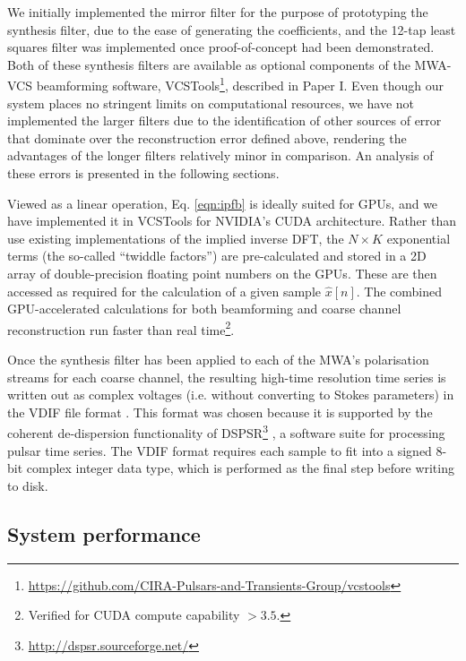 \documentclass{pasa}%
\newcommand{\PaperI}{Paper I\nocite{Ord2019}}
\newcommand{\vcstools}{VCSTools}
\begin{document}
We initially implemented the mirror filter for the purpose of prototyping the synthesis filter, due to the ease of generating the coefficients, and the 12-tap least squares filter was implemented once proof-of-concept had been demonstrated.
Both of these synthesis filters are available as optional components of the MWA-VCS beamforming software, \vcstools{}\footnote{\url{https://github.com/CIRA-Pulsars-and-Transients-Group/vcstools}}, described in \PaperI{}.
Even though our system places no stringent limits on computational resources, we have not implemented the larger filters due to the identification of other sources of error that dominate over the reconstruction error defined above, rendering the advantages of the longer filters relatively minor in comparison.
An analysis of these errors is presented in the following sections.

Viewed as a linear operation, Eq. \eqref{eqn:ipfb} is ideally suited for GPUs, and we have implemented it in \vcstools{} for NVIDIA's CUDA architecture.
Rather than use existing implementations of the implied inverse DFT, the $N \times K$ exponential terms (the so-called ``twiddle factors'') are pre-calculated and stored in a 2D array of double-precision floating point numbers on the GPUs.
These are then accessed as required for the calculation of a given sample $\hat{x}[n]$.
The combined GPU-accelerated calculations for both beamforming and coarse channel reconstruction run faster than real time\footnote{Verified for CUDA compute capability $>3.5$.}.

Once the synthesis filter has been applied to each of the MWA's polarisation streams for each coarse channel, the resulting high-time resolution time series is written out as complex voltages (i.e. without converting to Stokes parameters) in the VDIF file format \citep{Whitney2009}.
This format was chosen because it is supported by the coherent de-dispersion functionality of DSPSR\footnote{\url{http://dspsr.sourceforge.net/}} \citep{VanStraten2011b}, a software suite for processing pulsar time series.
The VDIF format requires each sample to fit into a signed 8-bit complex integer data type, which is performed as the final step before writing to disk.

\subsection{System performance}
\end{document}
